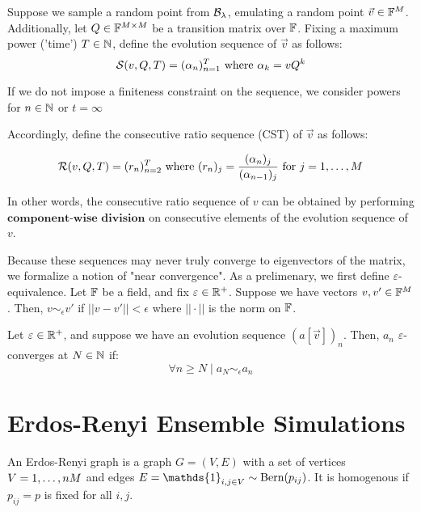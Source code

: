 \begin{definition}
Suppose we sample a random point from $\B_\lambda$, emulating a random point $\vec{v} \in \F^M$. Additionally, let $Q \in \F^{M \times M}$ be a transition matrix over $\F$. Fixing a maximum power ('time') $T \in \N$, define the evolution sequence of $\vec{v}$ as follows:
$$\Seq(v, Q, T) = (\alpha_n)_{n=1}^T \text{ where } \alpha_k = {v}Q^k$$

If we do not impose a finiteness constraint on the sequence, we consider powers for $n \in \N$ or $t = \infty$
\end{definition}


\begin{definition}

Accordingly, define the consecutive ratio sequence (CST) of $\vec{v}$ as follows:

$$\Rseq(v, Q, T) = (r_n)_{n=2}^T \text{ where } (r_n)_j = \frac{(\alpha_n)_j}{(\alpha_{n-1})_j} \text{ for } j = \oneto[M]$$

In other words, the consecutive ratio sequence of $v$ can be obtained by performing $\textbf{component-wise division}$ on consecutive elements of the evolution sequence of $v$.
\end{definition}

\begin{definition}

Because these sequences may never truly converge to eigenvectors of the matrix, we formalize a notion of "near convergence". As a prelimenary, we first define $\varepsilon$-equivalence. Let $\F$ be a field, and fix $\varepsilon \in \R^+$. Suppose we have vectors $v, v' \in \F^M$. Then, $v \sim_\epsilon v'$ if $||v - v'|| < \epsilon$ where $|| \cdot ||$ is the norm on $\F$.
\end{definition}

Let $\varepsilon \in \R^+$, and suppose we have an evolution sequence $(a[\vec{v}])_n$. Then, $a_n$ $\varepsilon$-converges at $N \in \N$ if:
$$\forall n \geq N \mid  a_N \sim_\epsilon a_n$$


\section{Erdos-Renyi Ensemble Simulations}

\begin{definition}
An Erdos-Renyi graph is a graph $G = (V,E)$ with a set of vertices $V = \oneto{M}$ and edges $E = \mathds{1}_{i,j \in V} \sim \Bern(p_{ij})$. It is homogenous if $p_{ij} = p$ is fixed for all $i, j$.
\end{definition}

